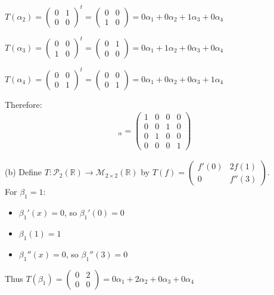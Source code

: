 \documentclass{article}
\begin{document}
$T(\alpha_2) = \begin{pmatrix} 0 & 1 \\ 0 & 0 \end{pmatrix}^t = \begin{pmatrix} 0 & 0 \\ 1 & 0 \end{pmatrix} = 0\alpha_1 + 0\alpha_2 + 1\alpha_3 + 0\alpha_4$

$T(\alpha_3) = \begin{pmatrix} 0 & 0 \\ 1 & 0 \end{pmatrix}^t = \begin{pmatrix} 0 & 1 \\ 0 & 0 \end{pmatrix} = 0\alpha_1 + 1\alpha_2 + 0\alpha_3 + 0\alpha_4$

$T(\alpha_4) = \begin{pmatrix} 0 & 0 \\ 0 & 1 \end{pmatrix}^t = \begin{pmatrix} 0 & 0 \\ 0 & 1 \end{pmatrix} = 0\alpha_1 + 0\alpha_2 + 0\alpha_3 + 1\alpha_4$

Therefore:
\begin{align*}
[T]_{\alpha} = \begin{pmatrix} 
1 & 0 & 0 & 0 \\
0 & 0 & 1 & 0 \\
0 & 1 & 0 & 0 \\
0 & 0 & 0 & 1
\end{pmatrix}
\end{align*}

(b) Define $T : \mathcal{P}_2(\mathbb{R}) \to \mathcal{M}_{2\times2}(\mathbb{R})$ by $T(f) = \begin{pmatrix} f'(0) & 2f(1) \\ 0 & f''(3) \end{pmatrix}$. \\

For $\beta_1 = 1$:
\begin{itemize}
    \item $\beta_1'(x) = 0$, so $\beta_1'(0) = 0$
    \item $\beta_1(1) = 1$
    \item $\beta_1''(x) = 0$, so $\beta_1''(3) = 0$
\end{itemize}

Thus $T(\beta_1) = \begin{pmatrix} 0 & 2 \\ 0 & 0 \end{pmatrix} = 0\alpha_1 + 2\alpha_2 + 0\alpha_3 + 0\alpha_4$
\end{document}
